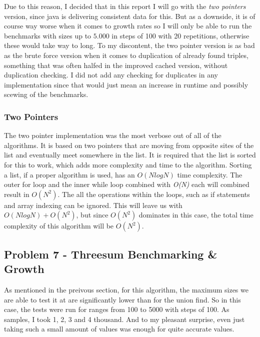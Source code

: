 \documentclass[12pt]{article}
\begin{document}
Due to this reason, I decided that in this report I will go with the \emph{two pointers}
version, since java is delivering consistent data for this. But as a downside, it is of course way
worse when it comes to growth rates so I will only be able to run the benchmarks with sizes up to $5.000$
in steps of 100 with 20 repetitions, otherwise these would take way to long. To my discontent, the two pointer version
is as bad as the brute force version when it comes to duplication of already found triples, something that
was often halfed in the improved cached version, without duplication checking. I did not add any checking for 
duplicates in any implementation since that would just mean an increase in runtime and possibly scewing of the benchmarks.

\subsubsection{Two Pointers}

The two pointer implementation was the most verbose out of all of the algorithms. It is based on
two pointers that are moving from opposite sites of the list and eventually meet somewhere in the list.
It is required that the list is sorted for this to work, which adds more complexity and time to the algorithm.
Sorting a list, if a proper algorithm is used, has an $O(N log N)$ time complexity. 
The outer for loop  and the inner while loop combined with \emph{O(N)} each will combined result in 
$O(N^2)$. The all the operations within the loops, such as if statements and array indexing can be ignored.
This will leave us with $O(N log N) + O(N^2)$, but since $O(N^2)$ dominates in this case,
the total time complexity of this algorithm will be $O(N^2)$.

\pagebreak
\subsection{Problem 7 - Threesum Benchmarking \& Growth}

As mentioned in the preivous section, for this algorithm, the maximum sizes we are able to test it at 
are significantly lower than for the union find. So in this case, the tests were run for ranges from
100 to 5000 with steps of 100. As samples, I took 1, 2, 3 and 4 thousand. And to my pleasant surprise, even
just taking such a small amount of values was enough for quite accurate values.
\end{document}
